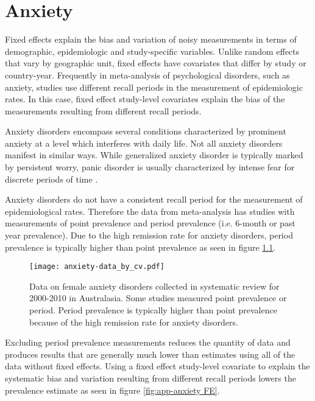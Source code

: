 \chapter{Anxiety}
\label{applications-efx_study_level}

Fixed effects explain the bias and variation of noisy measurements in terms of demographic, epidemiologic and study-specific variables.  Unlike random effects that vary by geographic unit, fixed effects have covariates that differ by study or country-year.  Frequently in meta-analysis of psychological disorders, such as anxiety, studies use different recall periods in the measurement of epidemiologic rates.  In this case, fixed effect study-level covariates explain the bias of the measurements resulting from different recall periods.

Anxiety disorders encompass several conditions characterized by prominent anxiety at a level which interferes with daily life.  Not all anxiety disorders manifest in similar ways.  While generalized anxiety disorder is typically marked by persistent worry, panic disorder is usually characterized by intense fear for discrete periods of time \cite{american_diagnostic_2000}.

Anxiety disorders do not have a consistent recall period for the measurement of epidemiological rates.  Therefore the data from meta-analysis has studies with measurements of point prevalence and period prevalence (i.e. 6-month or past year prevalence).  Due to the high remission rate for anxiety disorders, period prevalence is typically higher than point prevalence as seen in figure \ref{fig:app-anxiety data}.

    \begin{figure}[h]
        \begin{center}
            \texttt{[image: anxiety-data\_by\_cv.pdf]}
            \caption{Data on female anxiety disorders collected in systematic review for 2000-2010 in Australasia.  Some studies measured point prevalence or period.  Period prevalence is typically higher than point prevalence because of the high remission rate for anxiety disorders.}
            \label{fig:app-anxiety data}
        \end{center}
    \end{figure}
    
Excluding period prevalence measurements reduces the quantity of data and produces results that are generally much lower than estimates using all of the data without fixed effects.  Using a fixed effect study-level covariate to explain the systematic bias and variation resulting from different recall periods lowers the prevalence estimate as seen in figure \ref{fig:app-anxiety FE}.


